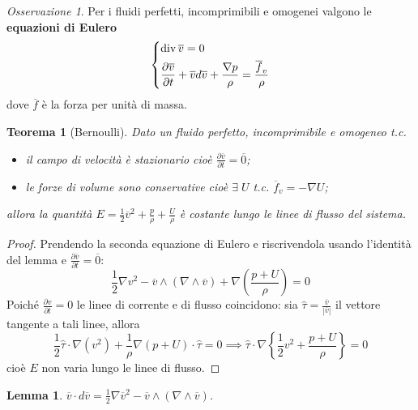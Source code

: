 \documentclass{book}
\theoremstyle{plain}
\newtheorem{teo}{Teorema}[chapter]
\theoremstyle{plain}
\newtheorem*{lemma}{Lemma}
\theoremstyle{plain}
\theoremstyle{plain}
\theoremstyle{plain}
\theoremstyle{definition}
\theoremstyle{remark}
\newtheorem*{oss}{Osservazione}
\theoremstyle{definition}
\begin{document}
\begin{oss}
    Per i fluidi perfetti, incomprimibili e omogenei valgono le \textbf{equazioni di Eulero}
    \begin{displaymath}
        \begin{dcases}
        \operatorname{div}\overline{v}=0 \\ \frac{\partial\overline{v}}{\partial t} +\overline{v}d\overline{v} +\frac{\nabla p}{\rho}=\frac{\overline{f}_v}{\rho}
        \end{dcases}
    \end{displaymath}
    dove $\overline{f}$ è la forza per unità di massa.
\end{oss}

\begin{teo}[Bernoulli]
\everymath{\displaystyle}
    Dato un fluido perfetto, incomprimibile e omogeneo t.c. 
    \begin{itemize}
        \item il campo di velocità è stazionario cioè $\frac{\partial\overline{v}}{\partial t}=\overline{0}$;
        \item le forze di volume sono conservative cioè $\exists \; U$ t.c. $\overline{f}_v=-\nabla U$;
    \end{itemize}
    allora la quantità $E=\frac{1}{2}\overline{v}^2+\frac{p}{\rho}+\frac{U}{\rho}$ è costante lungo le linee di flusso del sistema.
\end{teo}

\begin{proof}
    Prendendo la seconda equazione di Eulero e riscrivendola usando l'identità del lemma e $\frac{\partial\overline{v}}{\partial t}=\overline{0}$:
    \begin{displaymath}
        \frac{1}{2}\nabla v^2-\overline{v}\wedge(\nabla\wedge\overline{v})+\nabla\left(\frac{p+U}{\rho}\right)=0
    \end{displaymath}
    Poiché $\frac{\partial v}{\partial t}=0$ le linee di corrente e di flusso coincidono: sia $\hat{\tau}=\frac{\overline{v}}{|\overline{v}|}$ il vettore tangente a tali linee, allora
    \begin{displaymath}
        \frac{1}{2}\hat{\tau}\cdot\nabla (v^2)+\frac{1}{\rho}\nabla(p+U)\cdot\hat{\tau}=0 \implies \hat{\tau}\cdot\nabla\left\{\frac{1}{2}v^2+\frac{p+U}{\rho}\right\}=0
    \end{displaymath}
    cioè $E$ non varia lungo le linee di flusso.
\end{proof}

\begin{lemma}
    $\overline{v}\cdot d\overline{v}=\frac{1}{2}\nabla\overline{v}^2 -\overline{v}\wedge(\nabla\wedge\overline{v})$.
\end{lemma}
\end{document}
